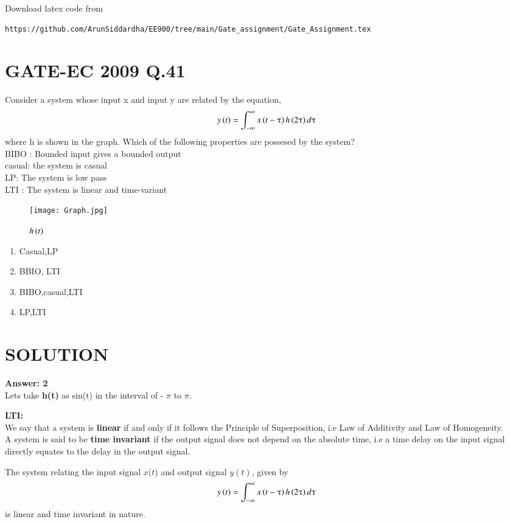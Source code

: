 \documentclass[journal,12pt,twocolumn]{IEEEtran}
\begin{document}
%
Download latex code from 
%
\begin{lstlisting}
https://github.com/ArunSiddardha/EE900/tree/main/Gate_assignment/Gate_Assignment.tex
\end{lstlisting}

\section*{GATE-EC 2009 Q.41}
Consider a system whose input x and input y are related by the equation,
$$y\left(t\right)=\int_{-\infty}^{\infty}x\left(t-\uptau\right)h\left(2\uptau\right)d\uptau$$
where h is shown in the graph.
Which of the following properties are possesed by the system?\\
BIBO : Bounded input gives a bounded output\\
casual: the system is casual\\
LP: The system is low pass\\
LTI : The system is linear and time-variant\\
\begin{figure}[htp]
    \centering
    \texttt{[image: Graph.jpg]}
    \caption{$h\left(t\right)$}
    \label{fig:my_label}
\end{figure}
\begin{enumerate}
    \item Casual,LP 
    \item BBIO, LTI
    \item BIBO,casual,LTI
    \item LP,LTI
\end{enumerate}
\section*{SOLUTION}
\textbf{Answer: 2}\\
Lets take \textbf{h(t)} as sin(t) in the interval of - $\pi$ to $\pi$.

\textbf{LTI:}\\
We say that a system is\textbf{ linear} if and only if it follows the Principle of Superposition, i.e Law of Additivity and Law of Homogeneity.\\
A system is said to be \textbf{time invariant} if the output signal does not depend on the absolute time, i.e a time delay on the input signal directly equates to the delay in the output signal.
\label{T}

The system relating the input signal $x(t$) and output signal $y(t)$, given by 
\begin{align}
     y\left(t\right)=\int_{-\infty}^{\infty}x\left(t-\uptau\right)h\left(2\uptau\right)d\uptau \label{L}
\end{align}
is linear and time invariant in nature.
\end{document}
